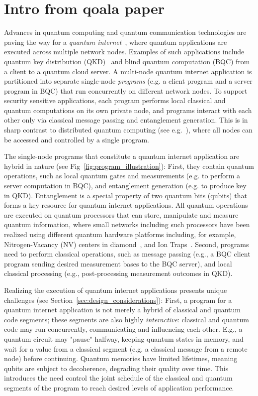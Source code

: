 \section{Intro from qoala paper}
Advances in quantum computing and quantum communication technologies are paving the way for a \textit{quantum internet}~\cite{wehner2018quantum, kimble2008quantum}, where quantum applications are executed across multiple network nodes.
Examples of such applications include quantum key distribution (QKD)~\cite{bennett2014quantum, ekert1991quantum} and blind quantum computation (BQC) \cite{broadbent2009universal, arrighi2006blind} from a client to a quantum cloud server.
A multi-node quantum internet application is partitioned into separate single-node \textit{programs} (e.g. a client program and a server program in BQC) that run concurrently on different network nodes. To support security sensitive applications, each program performs local classical and quantum computations on its own private node, and programs interact with each other only via classical message passing and entanglement generation. This is in sharp contrast to distributed quantum computing (see e.g.~\cite{cacciapuoti2019quantum}), where all nodes can be accessed and controlled by a single program. 

The single-node programs that constitute a quantum internet application are hybrid in nature (see Fig~\ref{fig:program_illustration}):
First, they contain quantum operations, such as local quantum gates and measurements (e.g. to perform a server computation in BQC), and entanglement generation (e.g. to produce key in QKD). Entanglement is a special property of two quantum bits (qubits) that forms a key resource for quantum internet applications. 
All quantum operations are executed on quantum processors that can store, manipulate and measure quantum information, where small networks including such processors have been realized using different quantum hardware platforms including, for example,  Nitrogen-Vacancy (NV) centers in diamond~\cite{pompili2021realization}, and Ion Traps~\cite{krutyanskiy2023entanglement}.
Second, programs need to perform classical operations, such as message passing (e.g., a BQC client program sending desired measurement bases to the BQC server), and local classical processing (e.g., post-processing measurement outcomes in QKD).

Realizing the execution of quantum internet applications presents unique challenges (see Section~\ref{sec:design_considerations}): 
First, a program for a quantum internet application is not merely a hybrid of classical and quantum code segments; these segments are also highly \textit{interactive}: classical and quantum code may run concurrently, communicating and influencing each other.
E.g., a quantum circuit may "pause" halfway, keeping quantum states in memory, and wait for a value from a classical segment (e.g. a classical message from a remote node) before continuing.
Quantum memories have limited lifetimes, meaning qubits are subject to decoherence, degrading their quality over time. This introduces the need 
control the joint schedule of the classical and quantum segments of the program to reach desired levels of application performance.

